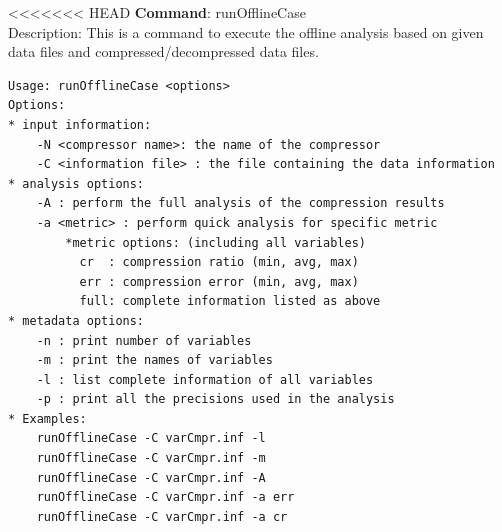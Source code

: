 <<<<<<< HEAD
\textbf{Command}: runOfflineCase\\
Description: This is a command to execute the offline analysis based on given data files and compressed/decompressed data files.
\begin{lstlisting}[style=ShellStyleInline, basicstyle = \footnotesize\ttfamily]
Usage: runOfflineCase <options>
Options:
* input information:
    -N <compressor name>: the name of the compressor
    -C <information file> : the file containing the data information
* analysis options:
    -A : perform the full analysis of the compression results
    -a <metric> : perform quick analysis for specific metric
        *metric options: (including all variables)
          cr  : compression ratio (min, avg, max)
          err : compression error (min, avg, max)
          full: complete information listed as above
* metadata options:
    -n : print number of variables
    -m : print the names of variables
    -l : list complete information of all variables
    -p : print all the precisions used in the analysis
* Examples:
    runOfflineCase -C varCmpr.inf -l
    runOfflineCase -C varCmpr.inf -m
    runOfflineCase -C varCmpr.inf -A
    runOfflineCase -C varCmpr.inf -a err
    runOfflineCase -C varCmpr.inf -a cr
\end{lstlisting}

